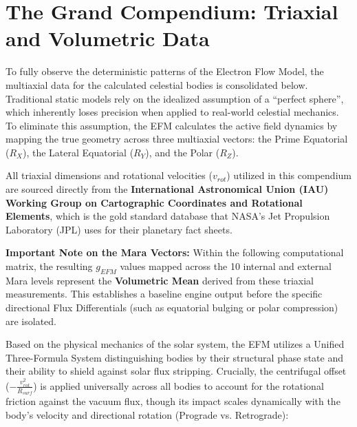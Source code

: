 \documentclass[11pt, a4paper]{article}
\begin{document}
\clearpage
\section{The Grand Compendium: Triaxial and Volumetric Data}

To fully observe the deterministic patterns of the Electron Flow Model, the multiaxial data for the calculated celestial bodies is consolidated below. Traditional static models rely on the idealized assumption of a ``perfect sphere'', which inherently loses precision when applied to real-world celestial mechanics. To eliminate this assumption, the EFM calculates the active field dynamics by mapping the true geometry across three multiaxial vectors: the Prime Equatorial ($R_X$), the Lateral Equatorial ($R_Y$), and the Polar ($R_Z$).

All triaxial dimensions and rotational velocities ($v_{rot}$) utilized in this compendium are sourced directly from the \textbf{International Astronomical Union (IAU) Working Group on Cartographic Coordinates and Rotational Elements}, which is the gold standard database that NASA's Jet Propulsion Laboratory (JPL) uses for their planetary fact sheets.

\textbf{Important Note on the Mara Vectors:} Within the following computational matrix, the resulting $g_{EFM}$ values mapped across the 10 internal and external Mara levels represent the \textbf{Volumetric Mean} derived from these triaxial measurements. This establishes a baseline engine output before the specific directional Flux Differentials (such as equatorial bulging or polar compression) are isolated.

Based on the physical mechanics of the solar system, the EFM utilizes a Unified Three-Formula System distinguishing bodies by their structural phase state and their ability to shield against solar flux stripping. Crucially, the centrifugal offset ($-\frac{v_{rot}^2}{R_{surf}}$) is applied universally across all bodies to account for the rotational friction against the vacuum flux, though its impact scales dynamically with the body's velocity and directional rotation (Prograde vs. Retrograde):
\end{document}
